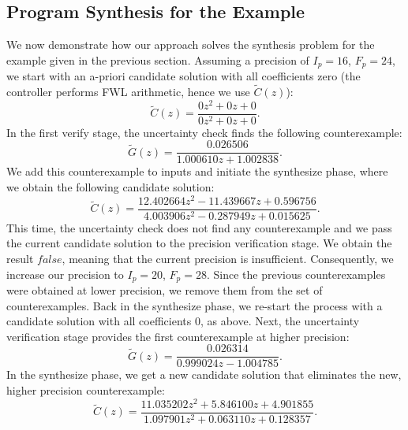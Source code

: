 \documentclass[final]{sig-alternate-05-2015}
\newcommand{\red}[1]{{\color{red}#1}}
\begin{document}
\subsection{Program Synthesis for the Example}
%
We now demonstrate how our approach solves the synthesis problem for the
example given in the previous section.  Assuming a precision of $I_p=16$,
$F_p=24$, we start with an a-priori candidate solution with all coefficients
zero (the controller performs FWL arithmetic, hence we use
$\tilde{C}(z)$):
%
$$ 
\tilde{C}(z)=\frac{0z^2{+}0z{+}0}{0z^2{+}0z{+}0}. 
$$
In the first {\sc verify} stage, the {\sc uncertainty} 
check finds the following counterexample:
%
$$ 
\tilde G(z) = \frac{0.026506}{1.000610z+1.002838}. 
$$
We add this counterexample to {\sc inputs} and initiate the {\sc synthesize}
phase, where we obtain the following candidate solution:
%
$$
\tilde{C}(z)=\frac{12.402664z^2{-}11.439667z{+}0.596756}{4.003906z^2{-}0.287949z{+}0.015625}. 
$$ 
This time, the {\sc uncertainty} check does not find any
counterexample and we pass the current candidate solution to the {\sc
precision} verification stage.
%
%
We obtain the result $\mathit{false}$, meaning that the current precision is
insufficient.  Consequently, we increase our precision to $I_p=20$, $F_p=28$.
%
Since the previous counterexamples were obtained at lower precision, we
remove them from the set of counterexamples.  Back in the {\sc synthesize}
phase, we re-start the process with a candidate solution with all
coefficients $0$, as above.  Next, the {\sc uncertainty} verification stage provides
the first counterexample at higher precision:
%
$$ 
\tilde G(z) = \frac{0.026314}{0.999024z{-}1.004785}. 
$$
In the {\sc synthesize} phase, we get a new candidate solution that
eliminates the new, higher precision counterexample:
%
$$ 
\tilde{C}(z)=\frac{11.035202z^2{+}5.846100z{+}4.901855}{1.097901z^2{+}0.063110z{+}0.128357}. 
$$
%
\end{document}
